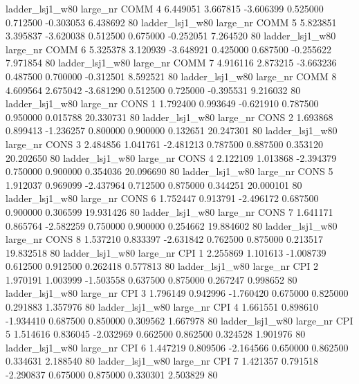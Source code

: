     ladder_lsj1_w80   large_nr     COMM                 4  6.449051  3.667815  -3.606399 0.525000 0.712500 -0.303053    6.438692 80
    ladder_lsj1_w80   large_nr     COMM                 5  5.823851  3.395837  -3.620038 0.512500 0.675000 -0.252051    7.264520 80
    ladder_lsj1_w80   large_nr     COMM                 6  5.325378  3.120939  -3.648921 0.425000 0.687500 -0.255622    7.971854 80
    ladder_lsj1_w80   large_nr     COMM                 7  4.916116  2.873215  -3.663236 0.487500 0.700000 -0.312501    8.592521 80
    ladder_lsj1_w80   large_nr     COMM                 8  4.609564  2.675042  -3.681290 0.512500 0.725000 -0.395531    9.216032 80
    ladder_lsj1_w80   large_nr     CONS                 1  1.792400  0.993649  -0.621910 0.787500 0.950000  0.015788   20.330731 80
    ladder_lsj1_w80   large_nr     CONS                 2  1.693868  0.899413  -1.236257 0.800000 0.900000  0.132651   20.247301 80
    ladder_lsj1_w80   large_nr     CONS                 3  2.484856  1.041761  -2.481213 0.787500 0.887500  0.353120   20.202650 80
    ladder_lsj1_w80   large_nr     CONS                 4  2.122109  1.013868  -2.394379 0.750000 0.900000  0.354036   20.096690 80
    ladder_lsj1_w80   large_nr     CONS                 5  1.912037  0.969099  -2.437964 0.712500 0.875000  0.344251   20.000101 80
    ladder_lsj1_w80   large_nr     CONS                 6  1.752447  0.913791  -2.496172 0.687500 0.900000  0.306599   19.931426 80
    ladder_lsj1_w80   large_nr     CONS                 7  1.641171  0.865764  -2.582259 0.750000 0.900000  0.254662   19.884602 80
    ladder_lsj1_w80   large_nr     CONS                 8  1.537210  0.833397  -2.631842 0.762500 0.875000  0.213517   19.832518 80
    ladder_lsj1_w80   large_nr      CPI                 1  2.255869  1.101613  -1.008739 0.612500 0.912500  0.262418    0.577813 80
    ladder_lsj1_w80   large_nr      CPI                 2  1.970191  1.003999  -1.503558 0.637500 0.875000  0.267247    0.998652 80
    ladder_lsj1_w80   large_nr      CPI                 3  1.796149  0.942996  -1.760420 0.675000 0.825000  0.291883    1.357976 80
    ladder_lsj1_w80   large_nr      CPI                 4  1.661551  0.898610  -1.934410 0.687500 0.850000  0.309562    1.667978 80
    ladder_lsj1_w80   large_nr      CPI                 5  1.514616  0.836045  -2.032969 0.662500 0.862500  0.324528    1.901976 80
    ladder_lsj1_w80   large_nr      CPI                 6  1.447219  0.809506  -2.164566 0.650000 0.862500  0.334631    2.188540 80
    ladder_lsj1_w80   large_nr      CPI                 7  1.421357  0.791518  -2.290837 0.675000 0.875000  0.330301    2.503829 80
